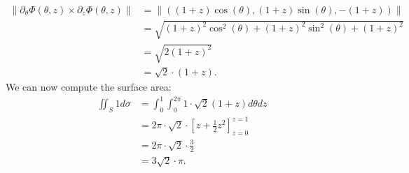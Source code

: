 \documentclass[11pt]{article}
\begin{document}
\begin{solution}
\begin{align*}
     \| \partial_{\theta} \Phi(\theta,z) \times \partial_{z} \Phi(\theta,z) \|
     &
     =
     \| \left( ( 1 + z ) \cos(\theta), ( 1 + z ) \sin(\theta), -( 1 + z ) \right) \|
     \\&
     =
     \sqrt{ ( 1 + z )^{2} \cos^{2}(\theta) + ( 1 + z )^{2} \sin^{2}(\theta) + ( 1 + z )^{2} }
     \\&
     =
     \sqrt{ 2 ( 1 + z )^{2} }
     \\&
     =
     \sqrt{ 2 } \cdot ( 1 + z )
     .
    \end{align*}
    We can now compute the surface area:
    \begin{align*}
        \iint_{S} 1 d\sigma
        &=
        \int_{0}^{1} \int_{0}^{2\pi} 1 \cdot \sqrt{2} ( 1 + z ) d\theta dz
        \\&
        =
        2\pi \cdot \sqrt{2} \cdot \left[ z + \frac 1 2 z^{2} \right]_{z=0}^{z=1}
        \\&
        =
        2\pi \cdot \sqrt{2} \cdot \frac 3 2 
        \\&
        =
        3\sqrt{2} \cdot \pi
        .
    \end{align*}
\end{solution}
\end{document}
